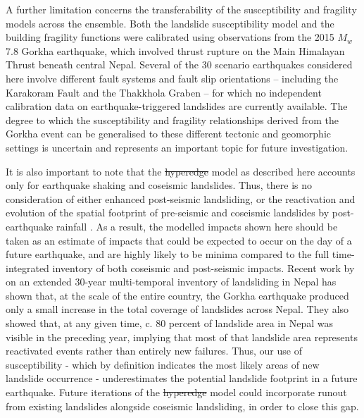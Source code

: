 \documentclass[preprint,12pt,authoryear]{elsarticle}
\makeatletter
\providecommand{\DIFaddtex}[1]{{\protect\color{blue}\uwave{#1}}} %
\providecommand{\DIFdeltex}[1]{{\protect\color{red}\sout{#1}}} %
\providecommand{\DIFaddbegin}{} %
\providecommand{\DIFaddend}{} %
\providecommand{\DIFdelbegin}{} %
\providecommand{\DIFdelend}{} %
\providecommand{\DIFadd}[1]{\texorpdfstring{\DIFaddtex{#1}}{#1}} %
\providecommand{\DIFdel}[1]{\texorpdfstring{\DIFdeltex{#1}}{}} %
\providecommand{\DIFscaledelfig}{0.5}
\newlength{\DIFdelgraphicswidth} %
\newlength{\DIFdelgraphicsheight} %
\providecommand{\DIFaddincludegraphics}[2][]{{\color{blue}\fbox{\DIFOincludegraphics[#1]{#2}}}} %
\providecommand{\DIFdelincludegraphics}[2][]{%
\sbox{\DIFdelgraphicsbox}{\DIFOincludegraphics[#1]{#2}}%
\settoboxwidth{\DIFdelgraphicswidth}{\DIFdelgraphicsbox} %
\settoboxtotalheight{\DIFdelgraphicsheight}{\DIFdelgraphicsbox} %
\scalebox{\DIFscaledelfig}{%
\parbox[b]{\DIFdelgraphicswidth}{\usebox{\DIFdelgraphicsbox}\\[-\baselineskip] \rule{\DIFdelgraphicswidth}{0em}}\llap{\resizebox{\DIFdelgraphicswidth}{\DIFdelgraphicsheight}{%
\setlength{\unitlength}{\DIFdelgraphicswidth}%
\begin{picture}(1,1)%
\thicklines\linethickness{2pt} %
{\color[rgb]{1,0,0}\put(0,0){\framebox(1,1){}}}%
{\color[rgb]{1,0,0}\put(0,0){\line( 1,1){1}}}%
{\color[rgb]{1,0,0}\put(0,1){\line(1,-1){1}}}%
\end{picture}%
}\hspace*{3pt}}} %
} %
\DeclareRobustCommand{\DIFaddbegin}{\DIFOaddbegin \let\includegraphics\DIFaddincludegraphics} %
\DeclareRobustCommand{\DIFaddend}{\DIFOaddend \let\includegraphics\DIFOincludegraphics} %
\DeclareRobustCommand{\DIFdelbegin}{\DIFOdelbegin \let\includegraphics\DIFdelincludegraphics} %
\DeclareRobustCommand{\DIFdelend}{\DIFOaddend \let\includegraphics\DIFOincludegraphics} %
\let\sout@orig\sout %
\renewcommand{\sout}[1]{\ifmmode\text{\sout@orig{\ensuremath{#1}}}\else\sout@orig{#1}\fi} %
\makeatother
\begin{document}
A further limitation concerns the transferability of the susceptibility and fragility models across the ensemble. Both the landslide susceptibility model and the building fragility functions were calibrated using observations from the 2015 $M_w$ 7.8 Gorkha earthquake, which involved thrust rupture on the Main Himalayan Thrust beneath central Nepal. Several of the 30 scenario earthquakes considered here involve different fault systems and fault slip orientations -- including the Karakoram Fault and the Thakkhola Graben -- for which no independent calibration data on earthquake-triggered landslides are currently available. The degree to which the susceptibility and fragility relationships derived from the Gorkha event can be generalised to these different tectonic and geomorphic settings is uncertain and represents an important topic for future investigation.

It is also important to note that the \DIFdelbegin \DIFdel{hyperedge }\DIFdelend \DIFaddbegin \DIFadd{hypergraph }\DIFaddend model as described here accounts only for earthquake shaking and coseismic landslides. Thus, there is no consideration of either enhanced post-seismic landsliding, or the reactivation and evolution of the spatial footprint of pre-seismic and coseismic landslides by post-earthquake rainfall \citep{Kincey2021,Kincey2023,Shrestha2026}. As a result, the modelled impacts shown here should be taken as an estimate of impacts that could be expected to occur on the day of a future earthquake, and are highly likely to be minima compared to the full time-integrated inventory of both coseismic and post-seismic impacts. Recent work by \citet{Harvey2026} on an extended 30-year multi-temporal inventory of landsliding in Nepal has shown that, at the scale of the entire country, the Gorkha earthquake produced only a small increase in the total coverage of landslides across Nepal. They also showed that, at any given time, c. 80 percent of landslide area in Nepal was visible in the preceding year, implying that most of that landslide area represents reactivated events rather than entirely new failures. Thus, our use of susceptibility - which by definition indicates the most likely areas of new landslide occurrence - underestimates the potential landslide footprint in a future earthquake. Future iterations of the \DIFdelbegin \DIFdel{hyperedge }\DIFdelend \DIFaddbegin \DIFadd{hypergraph }\DIFaddend model could incorporate runout from existing landslides \citep[e.g.,][]{Kincey2023} alongside coseismic landsliding, in order to close this gap.
\end{document}
